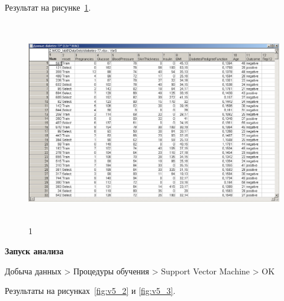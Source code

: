 Результат на рисунке~\ref{fig:v5_1}.

\begin{figure}[!h]
  \centering

  \includegraphics[height=9cm]
  {inc/v5_1.PNG}

  \caption{1}

  \label{fig:v5_1}
\end{figure}

\newpage

\begin{center}
  \textbf{Запуск анализа}
\end{center}

Добыча данных > Процедуры обучения > Support Vector Machine > OK

Результаты на рисунках~\ref{fig:v5_2} и \ref{fig:v5_3}.

